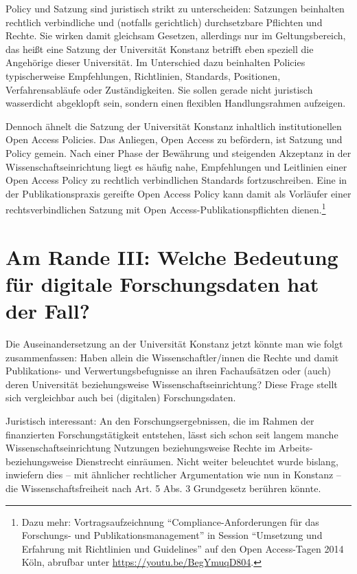 \documentclass[a4paper,
fontsize=11pt,
oneside,
numbers=noperiodatend,
parskip=half-,
bibliography=totoc,
final
]{scrartcl}
\begin{document}
Policy und Satzung sind juristisch strikt zu unterscheiden: Satzungen
beinhalten rechtlich verbindliche und (notfalls gerichtlich)
durchsetzbare Pflichten und Rechte. Sie wirken damit gleichsam Gesetzen,
allerdings nur im Geltungsbereich, das heißt eine Satzung der
Universität Konstanz betrifft eben speziell die Angehörige dieser
Universität. Im Unterschied dazu beinhalten Policies typischerweise
Empfehlungen, Richtlinien, Standards, Positionen, Verfahrensabläufe oder
Zuständigkeiten. Sie sollen gerade nicht juristisch wasserdicht
abgeklopft sein, sondern einen flexiblen Handlungsrahmen aufzeigen.

Dennoch ähnelt die Satzung der Universität Konstanz inhaltlich
institutionellen Open Access Policies. Das Anliegen, Open Access zu
befördern, ist Satzung und Policy gemein. Nach einer Phase der Bewährung
und steigenden Akzeptanz in der Wissenschaftseinrichtung liegt es häufig
nahe, Empfehlungen und Leitlinien einer Open Access Policy zu rechtlich
verbindlichen Standards fortzuschreiben. Eine in der Publikationspraxis
gereifte Open Access Policy kann damit als Vorläufer einer
rechtsverbindlichen Satzung mit Open Access-Publikationspflichten
dienen.\footnote{Dazu mehr: Vortragsaufzeichnung
  \enquote{Compliance-Anforderungen für das Forschungs- und
  Publikationsmanagement} in Session \enquote{Umsetzung und Erfahrung
  mit Richtlinien und Guidelines} auf den Open Access-Tagen 2014 Köln,
  abrufbar unter \url{https://youtu.be/BegYmuqD804}.}

\hypertarget{am-rande-iii-welche-bedeutung-fuxfcr-digitale-forschungsdaten-hat-der-fall}{%
\section*{Am Rande III: Welche Bedeutung für digitale
Forschungsdaten hat der
Fall?}\label{am-rande-iii-welche-bedeutung-fuxfcr-digitale-forschungsdaten-hat-der-fall}}

Die Auseinandersetzung an der Universität Konstanz jetzt könnte man wie
folgt zusammenfassen: Haben allein die Wissenschaftler/innen die Rechte
und damit Publikations- und Verwertungsbefugnisse an ihren Fachaufsätzen
oder (auch) deren Universität beziehungsweise Wissenschaftseinrichtung?
Diese Frage stellt sich vergleichbar auch bei (digitalen)
Forschungsdaten.

Juristisch interessant: An den Forschungsergebnissen, die im Rahmen der
finanzierten Forschungstätigkeit entstehen, lässt sich schon seit langem
manche Wissenschaftseinrichtung Nutzungen beziehungsweise Rechte im
Arbeits- beziehungsweise Dienstrecht einräumen. Nicht weiter beleuchtet
wurde bislang, inwiefern dies -- mit ähnlicher rechtlicher Argumentation
wie nun in Konstanz -- die Wissenschaftsfreiheit nach Art. 5 Abs. 3
Grundgesetz berühren könnte.
\end{document}
